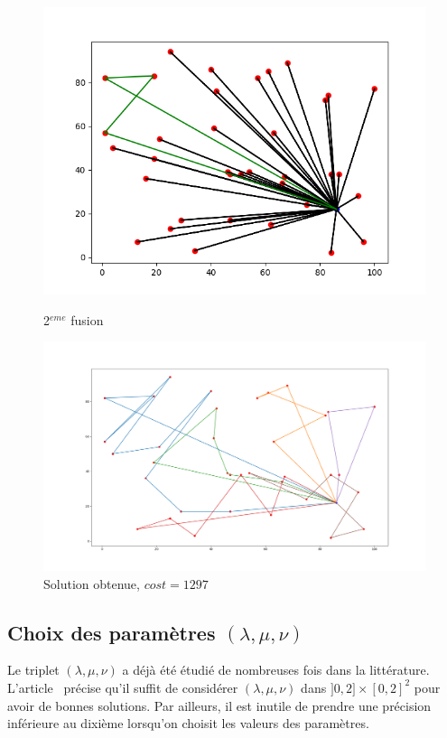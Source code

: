\documentclass[a4paper,11pt]{article}%
\begin{document}
\begin{figure}
    \begin{minipage}[c]{.46\linewidth}
        \centering
	\includegraphics[scale=0.4]{CW2.png}
	\caption{2$^{eme}$ fusion}
	\label{CW2}
    \end{minipage}
    \hfill%
    \begin{minipage}[c]{.46\linewidth}
        \centering
	 \includegraphics[scale=0.17]{resCW101010.png}
	 \caption{Solution obtenue, $cost = 1297$}
	\label{resCW101010}
    \end{minipage}
\end{figure}

\subsection{Choix des paramètres $(\lambda, \mu, \nu)$}
Le triplet $(\lambda, \mu, \nu)$ a déjà été étudié de nombreuses fois dans la littérature. L'article~\cite{Altinel_2005} précise qu'il suffit de considérer $(\lambda, \mu, \nu)$ dans $]0,2] \times [0,2]^2$ pour avoir de bonnes solutions. 
Par ailleurs, il est inutile de prendre une précision inférieure au dixième lorsqu'on choisit les valeurs des paramètres.
\end{document}
